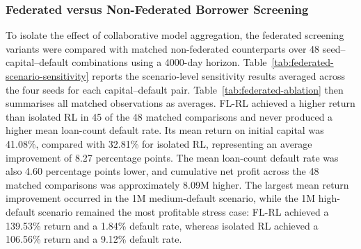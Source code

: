 \documentclass[12pt]{article}
\begin{document}
\subsubsection{Federated versus Non-Federated Borrower Screening}

To isolate the effect of collaborative model aggregation, the federated screening variants were compared with matched non-federated counterparts over 48 seed--capital--default combinations using a 4000-day horizon. Table~\ref{tab:federated-scenario-sensitivity} reports the scenario-level sensitivity results averaged across the four seeds for each capital--default pair. Table~\ref{tab:federated-ablation} then summarises all matched observations as averages. FL-RL achieved a higher return than isolated RL in 45 of the 48 matched comparisons and never produced a higher mean loan-count default rate. Its mean return on initial capital was 41.08\%, compared with 32.81\% for isolated RL, representing an average improvement of 8.27 percentage points. The mean loan-count default rate was also 4.60 percentage points lower, and cumulative net profit across the 48 matched comparisons was approximately 8.09M higher. The largest mean return improvement occurred in the 1M medium-default scenario, while the 1M high-default scenario remained the most profitable stress case: FL-RL achieved a 139.53\% return and a 1.84\% default rate, whereas isolated RL achieved a 106.56\% return and a 9.12\% default rate.
\end{document}
